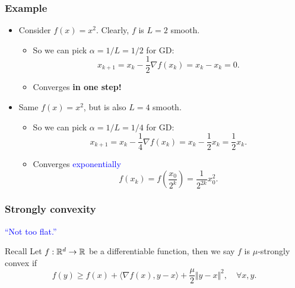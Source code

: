 \documentclass{beamer}
\begin{document}
\begin{frame}
  \frametitle{Example}

  \begin{itemize}
    \item Consider $f(x) = x^2$. Clearly, $f$ is $L=2$ smooth.
          \begin{itemize}
            \item So we can pick $\alpha=1/L = 1/2$ for GD:\
                  \begin{equation}
                    x_{k+1} = x_k - \frac12 \nabla f(x_k) = x_k -x_k = 0.
                  \end{equation}
            \item Converges \textbf{in one step!}
          \end{itemize}
    \item Same $f(x)=x^2$, but is also $L=4$ smooth.
          \begin{itemize}
            \item So we can pick $\alpha=1/L = 1/4$ for GD:\
                  \begin{equation}
                    x_{k+1} = x_k - \frac14 \nabla f(x_k) = x_k -\frac12 x_k = \frac12 x_k.
                  \end{equation}
            \item Converges \textcolor{blue}{exponentially}
                  \begin{equation}
                    f(x_k) = f\left(\frac{x_0}{2^k}\right) = \frac{1}{2^{2k}} x_0^2.
                  \end{equation}
           \end{itemize}
  \end{itemize}
\end{frame}


\begin{frame}
  \frametitle{Strongly convexity}

  \begin{center}
    \textcolor{blue}{``Not too flat.''}
  \end{center}

  \begin{block}{Recall}
    Let $f: \mathbb{R}^d \to \mathbb{R}$ be a differentiable function, then we say $f$ is $\mu$-strongly convex if
    \begin{equation}
      f(y) \ge f(x) + \langle \nabla f(x), y-x \rangle + \frac{\mu}{2} \Vert y-x \Vert^2, \quad \forall x,y.
    \end{equation}
  \end{block}

\end{frame}
\end{document}
